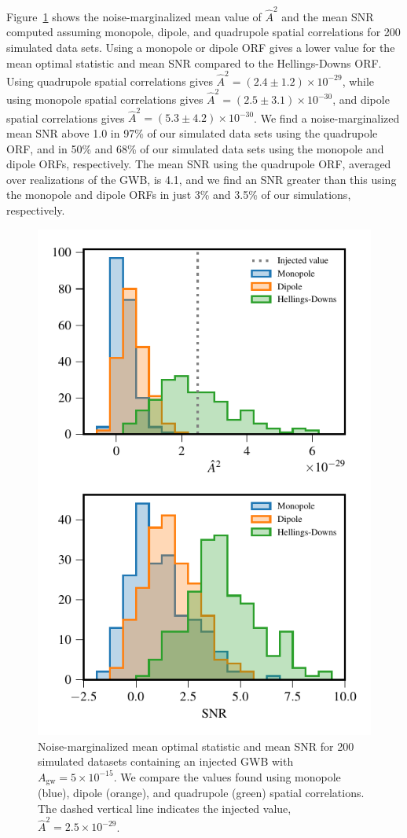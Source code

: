 \documentclass[twocolumn,aps,prd,superscriptaddress]{revtex4-1}
\newcommand{\Agw}{\ensuremath{A_\mathrm{gw}}}
\begin{document}
Figure~\ref{fig:os_ORF} shows the noise-marginalized 
mean value of $\hat{A}^2$ and the mean SNR 
computed assuming monopole, dipole, and quadrupole spatial correlations 
for 200 simulated data sets. Using a monopole or dipole ORF 
gives a lower value for the mean optimal statistic and mean SNR compared to the 
Hellings-Downs ORF. 
Using quadrupole spatial correlations gives $\hat{A}^2 = (2.4 \pm 1.2) \times 10^{-29}$, 
while using monopole spatial correlations gives $\hat{A}^2 = (2.5 \pm 3.1) \times 10^{-30}$, 
and dipole spatial correlations gives $\hat{A}^2 = (5.3 \pm 4.2) \times 10^{-30}$. 
We find a noise-marginalized mean SNR above 1.0 in 97\% of our simulated data sets 
using the quadrupole ORF, and in 50\% and 68\% of our simulated data sets 
using the monopole and dipole ORFs, respectively. 
The mean SNR using the quadrupole ORF, averaged over realizations of the GWB, is 4.1, 
and we find an SNR greater than this using the monopole and dipole ORFs in just 
3\% and 3.5\% of our simulations, respectively.
\begin{figure}[tb]
	\includegraphics[width=0.9\columnwidth]{plots/optstat_spatial_A5e-15.pdf}
	\caption{Noise-marginalized mean optimal statistic and mean SNR for 200 simulated datasets 
			containing an injected GWB with $\Agw = 5\times10^{-15}$. 
			We compare the values found using monopole (blue), dipole (orange), 
			and quadrupole (green) spatial correlations. 
			The dashed vertical line indicates the injected value, $\hat{A}^2 = 2.5 \times 10^{-29}$.}
	\label{fig:os_ORF}
\end{figure}
\end{document}
